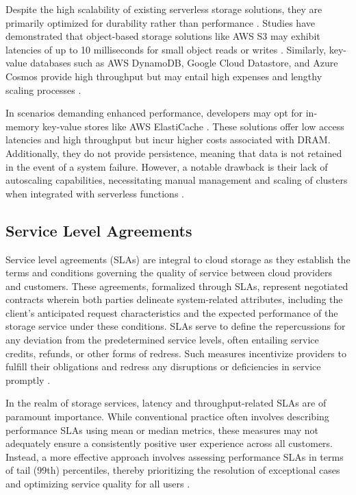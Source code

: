 Despite the high scalability of existing serverless storage solutions, they are primarily optimized for durability rather than performance \cite{jonas2019cloud,klimovic2018pocket,10.14778/3587136.3587139}. Studies have demonstrated that object-based storage solutions like AWS S3 may exhibit latencies of up to 10 milliseconds for small object reads or writes \cite{PublicCl96:online}. Similarly, key-value databases such as AWS DynamoDB, Google Cloud Datastore, and Azure Cosmos provide high throughput but may entail high expenses and lengthy scaling processes \cite{jonas2019cloud}.

In scenarios demanding enhanced performance, developers may opt for in-memory key-value stores like AWS ElastiCache \cite{AmazonEl88:online}. These solutions offer low access latencies and high throughput but incur higher costs associated with DRAM. Additionally, they do not provide persistence, meaning that data is not retained in the event of a system failure. However, a notable drawback is their lack of autoscaling capabilities, necessitating manual management and scaling of clusters when integrated with serverless functions \cite{jonas2019cloud,klimovic2018pocket,10.14778/3587136.3587139}.

\subsection{Service Level Agreements}
Service level agreements (SLAs) are integral to cloud storage as they establish the terms and conditions governing the quality of service between cloud providers and customers. These agreements, formalized through SLAs, represent negotiated contracts wherein both parties delineate system-related attributes, including the client's anticipated request characteristics and the expected performance of the storage service under these conditions. SLAs serve to define the repercussions for any deviation from the predetermined service levels, often entailing service credits, refunds, or other forms of redress. Such measures incentivize providers to fulfill their obligations and redress any disruptions or deficiencies in service promptly \cite{DeCandia2007,180275,tariq2020sequoia}.

In the realm of storage services, latency and throughput-related SLAs are of paramount importance. While conventional practice often involves describing performance SLAs using mean or median metrics, these measures may not adequately ensure a consistently positive user experience across all customers. Instead, a more effective approach involves assessing performance SLAs in terms of tail (99th) percentiles, thereby prioritizing the resolution of exceptional cases and optimizing service quality for all users \cite{DeCandia2007}.

